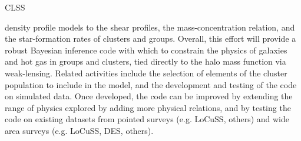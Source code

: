 {\begin{tasklist}{CLSS}
\begin{task}
{density profile models to the shear profiles, the mass-concentration
relation, and the star-formation rates of clusters and groups.
Overall, this effort will provide a robust Bayesian inference code with which
to constrain the physics of galaxies and hot gas in groups and
clusters, tied directly to the halo mass function via weak-lensing.
Related activities include the selection of elements of the cluster population to include in the model,
and the development and testing of the code on simulated data.
Once developed, the code can be improved by extending the range of physics 
explored by adding more physical relations, and by testing the code on existing 
datasets from pointed surveys (e.g. LoCuSS, others) and wide area surveys (e.g. LoCuSS, DES, others).
}
~\\
\end{task}



\end{tasklist}
}
